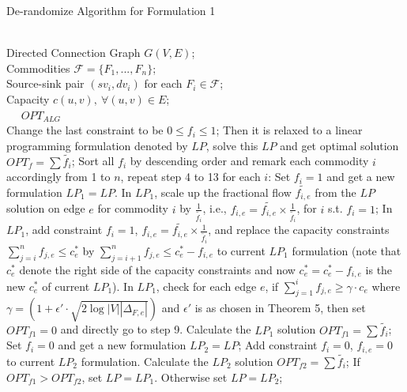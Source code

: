 \documentclass[conference]{IEEEtran}
\begin{document}
\begin{algorithm}[t]
	\small
	\renewcommand{\algorithmicrequire}{\textbf{Input:}}
	\renewcommand\algorithmicensure {\textbf{Output:} }
	\caption{De-randomize Algorithm for Formulation 1}
	\label{alg:derandomize}
	\begin{algorithmic}[1] %
		\REQUIRE ~~\\ %
		Directed Connection Graph $G(V, E)$;\\
		Commodities $\mathcal{F} = \{F_1, ..., F_n\}$;\\
		Source-sink pair $(sv_i, dv_i)$ for each $ F_i \in \mathcal{F}$;\\
		Capacity $c(u, v), ~ \forall (u, v)\in E$;\\
		\ENSURE ~~ $OPT_{ALG}$\\ 
		\STATE Change the last constraint to be 
		$0 \leq f_i \leq 1$;
		\STATE Then it is relaxed to a linear programming formulation denoted by $LP$, solve this $LP$ and get optimal solution $OPT_f = \sum \tilde{f_i}$;
		\STATE Sort all $f_i$ by descending order and remark each commodity $i$ accordingly from 1 to $n$, repeat step 4 to 13 for each $i$: 
		\STATE Set $f_i = 1$ and get a new formulation $LP_1 = LP$.
		\STATE In $LP_1$, scale up the fractional flow $\tilde{f_{i,e}}$ from the $LP$ solution on edge $e$ for commodity $i$ by $\frac{1}{\tilde{f_i}}$, i.e., $f_{i,e} = \tilde{f_{i,e}} \times \frac{1}{\tilde{f_i}}$, for $i$ s.t. $f_i = 1$;
		\STATE In $LP_1$, add constraint $f_i = 1$, $f_{i,e} = \tilde{f_{i,e}} \times \frac{1}{\tilde{f_i}}$, and replace the capacity constraints $\sum_{j=i}^{n} f_{j,e} \le c^*_e$ by $\sum_{j=i+1}^{n} f_{j,e} \le c^*_e - f_{i,e}$ to current $LP_1$ formulation (note that $c^*_e$ denote the right side of the capacity constraints and now $c^*_e = c^*_e - f_{i,e}$ is the new $c^*_e$ of current $LP_1$).
		\STATE In $LP_1$, check for each edge $e$, if $\sum_{j=1}^{i} f_{j,e} \ge \gamma \cdot c_e$ where $\gamma = (1+\epsilon' \cdot \sqrt{2\log|V||\Delta_{F,e}|})$ and $\epsilon'$ is as chosen in Theorem 5, then set $OPT_{f1} = 0$ and directly go to step 9.
		\STATE Calculate the $LP_1$ solution $OPT_{f1} = \sum \tilde{f_i}$;
		\STATE Set $f_i = 0$ and get a new formulation $LP_2 = LP$;
		\STATE Add constraint $f_i = 0$, $f_{i,e} = 0$ to current $LP_2$ formulation.
		\STATE Calculate the $LP_2$ solution $OPT_{f2} = \sum \tilde{f_i}$;
		\STATE If $OPT_{f1} > OPT_{f2}$, set $LP = LP_1$. 
		\STATE Otherwise set $LP = LP_2$;
		
	\end{algorithmic}
\end{algorithm}
\end{document}
